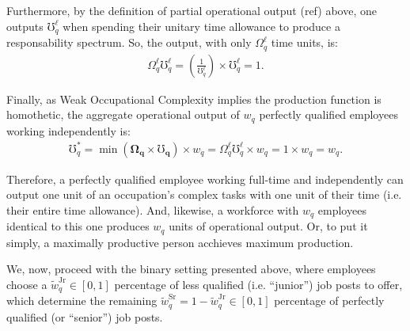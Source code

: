 \documentclass[hidelinks, nonatbib]{elsarticle}
\begin{document}
\begin{enumerate}
    Furthermore, by the definition of partial operational output (ref) above, one outputs $\mho_{q}^{\ell}$ when spending their unitary time allowance to produce a responsability spectrum. So, the output, with only $\Omega_{q}^{\ell}$ time units, is:
    \begin{gather}
        \Omega_{q}^{\ell}
        \mho_{q}^{\ell}
        =
        \left(
            \frac{1}{\mho_{q}^{\ell}}
        \right)
        \times
        \mho_{q}^{\ell}
        =
        1
        .
    \end{gather}
    
    Finally, as Weak Occupational Complexity implies the production function is homothetic, the aggregate operational output of $w_q$ perfectly qualified employees working independently is:
    \begin{gather}
        \mho_{q}^{*}
        =
        \min(
            \boldsymbol{\Omega_q}
            \times
            \boldsymbol{\mho_q}
        )
        \times
        w_q
        =
        \Omega_{q}^{\ell}
        \mho_{q}^{\ell}
        \times
        w_q
        =
        1
        \times
        w_q
        =
        w_q
        .
    \end{gather}

    Therefore, a perfectly qualified employee working full-time and independently can output one unit of an occupation's complex tasks with one unit of their time (i.e. their entire time allowance). And, likewise, a workforce with $w_q$ employees identical to this one produces $w_q$ units of operational output. Or, to put it simply, a maximally productive person acchieves maximum production.
    
    We, now, proceed with the binary setting presented above, where employees choose a $\tilde{w}_{q}^{\text{Jr}} \in [0,1]$ percentage of less qualified (i.e. ``junior'') job posts to offer, which determine the remaining $\tilde{w}_{q}^{\text{Sr}} = 1 - \tilde{w}_{q}^{\text{Jr}} \in [0,1]$ percentage of perfectly qualified (or ``senior'') job posts.
    

\end{enumerate}
\end{document}
